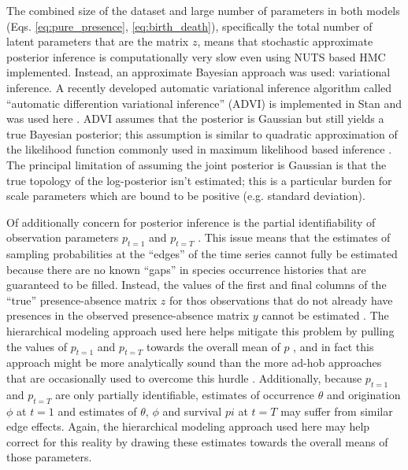 \documentclass[12pt,letterpaper]{article}
\begin{document}
The combined size of the dataset and large number of parameters in both models (Eqs. \ref{eq:pure_presence}, \ref{eq:birth_death}), specifically the total number of latent parameters that are the matrix \(z\), means that stochastic approximate posterior inference is computationally very slow even using NUTS based HMC implemented. Instead, an approximate Bayesian approach was used: variational inference. A recently developed automatic variational inference algorithm called ``automatic differention variational inference'' (ADVI) is implemented in Stan and was used here \citep{Kucukelbir2015,StanDevelopmentTeam2016}. ADVI assumes that the posterior is Gaussian but still yields a true Bayesian posterior; this assumption is similar to quadratic approximation of the likelihood function commonly used in maximum likelihood based inference \citep{McElreath2016}. The principal limitation of assuming the joint posterior is Gaussian is that the true topology of the log-posterior isn't estimated; this is a particular burden for scale parameters which are bound to be positive (e.g. standard deviation).

Of additionally concern for posterior inference is the partial identifiability of observation parameters \(p_{t = 1}\) and \(p_{t = T}\) \citep{Royle2008}. This issue means that the estimates of sampling probabilities at the ``edges'' of the time series cannot fully be estimated because there are no known ``gaps'' in species occurrence histories that are guaranteed to be filled. Instead, the values of the first and final columns of the ``true'' presence-absence matrix \(z\) for thos observations that do not already have presences in the observed presence-absence matrix \(y\) cannot be estimated \citep{Royle2008}. The hierarchical modeling approach used here helps mitigate this problem by pulling the values of \(p_{t = 1}\) and \(p_{t = T}\) towards the overall mean of \(p\) \citep{Gelman2013d}, and in fact this approach might be more analytically sound than the more ad-hob approaches that are occasionally used to overcome this hurdle \citep{Royle2008}. Additionally, because \(p_{t = 1}\) and \(p_{t = T}\) are only partially identifiable, estimates of occurrence \(\theta\) and origination \(\phi\) at \(t = 1\) and estimates of \(\theta\), \(\phi\) and survival \(pi\) at \(t = T\) may suffer from similar edge effects. Again, the hierarchical modeling approach used here may help correct for this reality by drawing these estimates towards the overall means of those parameters.
\end{document}
